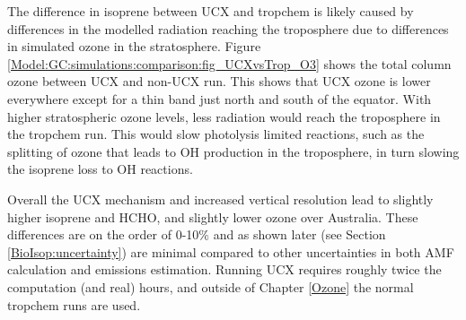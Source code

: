       
      The difference in isoprene between UCX and tropchem is likely caused by differences in the modelled radiation reaching the troposphere due to differences in simulated ozone in the stratosphere.
      Figure \ref{Model:GC:simulations:comparison:fig_UCXvsTrop_O3} shows the total column ozone between UCX and non-UCX run.
      This shows that UCX ozone is lower everywhere except for a thin band just north and south of the equator.
      With higher stratospheric ozone levels, less radiation would reach the troposphere in the tropchem run.
      This would slow photolysis limited reactions, such as the splitting of ozone that leads to OH production in the troposphere, in turn slowing the isoprene loss to OH reactions.
      
      
      Overall the UCX mechanism and increased vertical resolution lead to slightly higher isoprene and HCHO, and slightly lower ozone over Australia.
      These differences are on the order of 0-10\% and as shown later (see Section \ref{BioIsop:uncertainty}) are minimal compared to other uncertainties in both AMF calculation and emissions estimation.
      Running UCX requires roughly twice the computation (and real) hours, and outside of Chapter \ref{Ozone} the normal tropchem runs are used.
      
      
      
